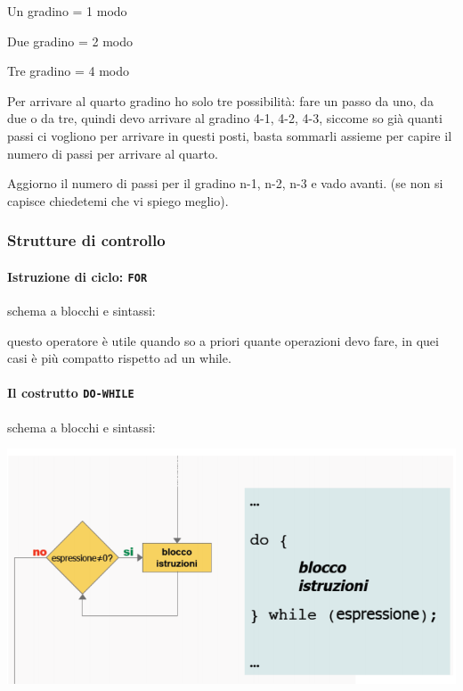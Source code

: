 \documentclass[
  paper=a4,
  oneside  ,captions=tableheading
]{scrbook}
\begin{document}
Un gradino = 1 modo

Due gradino = 2 modo

Tre gradino = 4 modo

Per arrivare al quarto gradino ho solo tre possibilità: fare un passo da
uno, da due o da tre, quindi devo arrivare al gradino 4-1, 4-2, 4-3,
siccome so già quanti passi ci vogliono per arrivare in questi posti,
basta sommarli assieme per capire il numero di passi per arrivare al
quarto.

Aggiorno il numero di passi per il gradino n-1, n-2, n-3 e vado avanti.
(se non si capisce chiedetemi che vi spiego meglio).

\hypertarget{strutture-di-controllo}{%
\subsubsection{Strutture di controllo}\label{strutture-di-controllo}}

\hypertarget{istruzione-di-ciclo-for}{%
\paragraph{\texorpdfstring{Istruzione di ciclo:
\texttt{FOR}}{Istruzione di ciclo: FOR}}\label{istruzione-di-ciclo-for}}

schema a blocchi e sintassi:

questo operatore è utile quando so a priori quante operazioni devo fare,
in quei casi è più compatto rispetto ad un while.

\hypertarget{il-costrutto-do-while}{%
\paragraph{\texorpdfstring{Il costrutto
\texttt{DO-WHILE}}{Il costrutto DO-WHILE}}\label{il-costrutto-do-while}}

schema a blocchi e sintassi:

\includegraphics{./image/image-20201207224157049.png}
\end{document}
